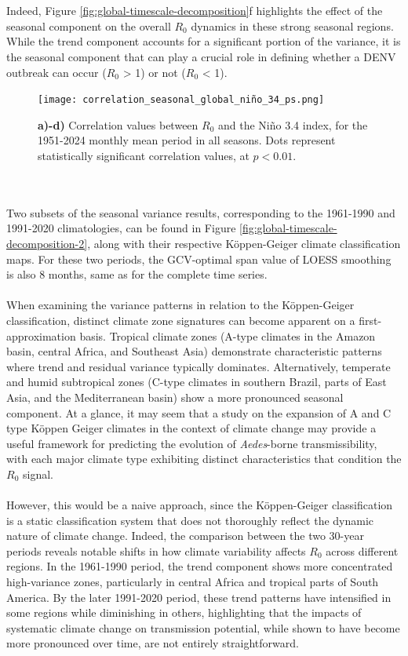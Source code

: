 \documentclass[10pt,twocolumn]{wlscirep}
\begin{document}
\\
\\
Indeed, Figure \ref{fig:global-timescale-decomposition}f highlights the effect of the seasonal component on the overall $R_0$ dynamics in these strong seasonal regions. While the trend component accounts for a significant portion of the variance, it is the seasonal component that can play a crucial role in defining whether a DENV outbreak can occur ($R_0$ > 1) or not ($R_0$ < 1).
\begin{figure}[!ht]
  \centering
  \texttt{[image: correlation\_seasonal\_global\_niño\_34\_ps.png]}
  \caption{\textbf{a)-d)} Correlation values between $R_0$ and the Niño 3.4 index, for the 1951-2024 monthly mean period in all seasons. Dots represent statistically significant correlation values, at $p < 0.01$.}
  \label{fig:global-correlation-niño-34}
\end{figure}
\\
\\
Two subsets of the seasonal variance results, corresponding to the 1961-1990 and 1991-2020 climatologies, can be found in Figure \ref{fig:global-timescale-decomposition-2}, along with their respective Köppen-Geiger climate classification maps\cite{beck_2023}. For these two periods, the GCV-optimal span value of LOESS smoothing is also 8 months, same as for the complete time series.
\\
\\
When examining the variance patterns in relation to the Köppen-Geiger classification, distinct climate zone signatures can become apparent on a first-approximation basis. Tropical climate zones (A-type climates in the Amazon basin, central Africa, and Southeast Asia) demonstrate characteristic patterns where trend and residual variance typically dominates. Alternatively, temperate and humid subtropical zones (C-type climates in southern Brazil, parts of East Asia, and the Mediterranean basin) show a more pronounced seasonal component. At a glance, it may seem that a study on the expansion of A and C type Köppen Geiger climates in the context of climate change may provide a useful framework for predicting the evolution of \textit{Aedes}-borne transmissibility, with each major climate type exhibiting distinct characteristics that condition the $R_0$ signal.
\\
\\
However, this would be a naive approach, since the Köppen-Geiger classification is a static classification system that does not thoroughly reflect the dynamic nature of climate change\cite{triantafyllou_1994}. Indeed, the comparison between the two 30-year periods reveals notable shifts in how climate variability affects $R_0$ across different regions. In the 1961-1990 period, the trend component shows more concentrated high-variance zones, particularly in central Africa and tropical parts of South America. By the later 1991-2020 period, these trend patterns have intensified in some regions while diminishing in others, highlighting that the impacts of systematic climate change on transmission potential, while shown to have become more pronounced over time, are not entirely straightforward.
\end{document}

